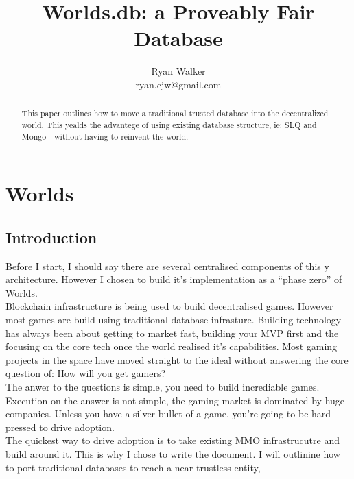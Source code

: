 \documentclass[runningheads,a4paper]{llncs}
\begin{document}
\mainmatter  %

\title{Worlds.db: a Proveably Fair Database}

\author{Ryan Walker\\
				ryan.cjw@gmail.com}

\institute{} %

\maketitle

\begin{abstract}
This paper outlines how to move a traditional trusted database into the
decentralized world. This yealds the advantege of using existing database
structure, ie: SLQ and Mongo - without having to reinvent the world.
\end{abstract}

\section{Worlds}
\subsection{Introduction}
Before I start, I should say there are several centralised components of this
y architecture. However I chosen to build it's implementation as a ``phase zero''
of Worlds. 
\\


Blockchain infrastructure is being used to build decentralised games. However
most games are build using traditional database infrasture. Building technology
has always been about getting to market fast, building your MVP first and the
focusing on the core tech once the world realised it's capabilities. Most gaming
projects in the space have moved straight to the ideal without answering the core
question of: How will you get gamers?
\\


The anwer to the questions is simple, you need to build incrediable games. Execution
on the answer is not simple, the gaming market is dominated by huge companies. Unless
you have a silver bullet of a game, you're going to be hard pressed to drive adoption.
\\

The quickest way to drive adoption is to take existing MMO infrastrucutre and build
around it. This is why I chose to write the document. I will outlinine how to
port traditional databases to reach a near trustless entity,
\end{document}
